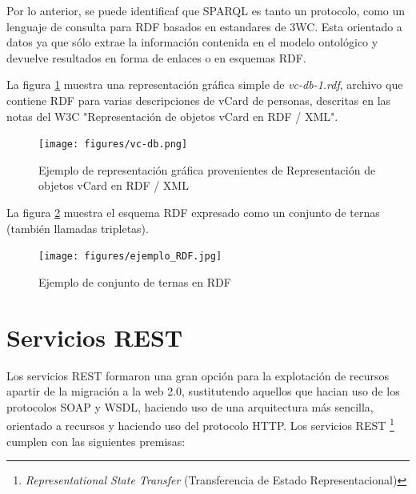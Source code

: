 Por lo anterior, se puede identificaf que SPARQL es tanto un protocolo, como un lenguaje de consulta para RDF basados en estandares de 3WC. Esta orientado a datos ya que sólo extrae la información contenida en el modelo ontológico y devuelve resultados en forma de enlaces o en esquemas RDF.\newline

La figura \ref{ejemplo_RDF_grafico} muestra una representación gráfica simple de \textit{vc-db-1.rdf}, archivo que contiene RDF para varias descripciones de vCard de personas, descritas en las notas del W3C "Representación de objetos vCard en RDF / XML".\newline

\begin{figure}[!ht]
    \centering
    \texttt{[image: figures/vc-db.png]} %
    \caption{Ejemplo de representación gráfica provenientes de Representación de objetos vCard en RDF / XML} %
    \label{ejemplo_RDF_grafico}
\end{figure}

La figura \ref{ejemplo_RDF_ternas} muestra el esquema RDF expresado como un conjunto de ternas (también llamadas tripletas).\newline

\begin{figure}[!ht]
    \centering
    \texttt{[image: figures/ejemplo\_RDF.jpg]} %
    \caption{Ejemplo de conjunto de ternas en RDF} %
    \label{ejemplo_RDF_ternas}
\end{figure}
    


\section{Servicios REST}

Los servicios REST formaron una gran opción para la explotación de recursos apartir de la migración a la web 2.0, sustitutendo aquellos que hacian uso de los protocolos SOAP y WSDL, haciendo uso de una arquitectura más sencilla, orientado a recursos y haciendo uso del protocolo HTTP. Los servicios REST \footnote{\textit{Representational State Transfer} (Transferencia de Estado Representacional)} cumplen con las siguientes premisas: \cite{FeaturesREST}

